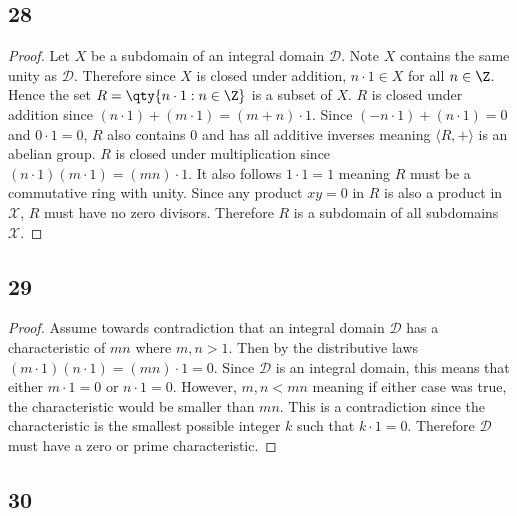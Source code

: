 \documentclass[12pt,titlepage]{extarticle}
\begin{document}
\subsection*{28}
\begin{proof}
    Let $X$ be a subdomain of an integral domain $\mathcal{D}$. Note $X$ contains the same unity as $\mathcal{D}$. Therefore since $X$ is closed under addition, $n \cdot 1 \in X$ for all $n \in \Z$. Hence the set $R = \qty{n \cdot 1 : n \in \Z}$ is a subset of $X$. $R$ is closed under addition since $(n \cdot 1) + (m \cdot 1) = (m + n) \cdot 1$. Since $(-n \cdot 1) + (n \cdot 1) = 0$ and $0 \cdot 1 = 0$, $R$ also contains $0$ and has all additive inverses meaning $\langle R, + \rangle$ is an abelian group. $R$ is closed under multiplication since $(n \cdot 1) (m \cdot 1) = (mn) \cdot 1$. It also follows $1 \cdot 1 = 1$ meaning $R$ must be a commutative ring with unity. Since any product $xy = 0$ in $R$ is also a product in $\mathcal{X}$, $R$ must have no zero divisors. Therefore $R$ is a subdomain of all subdomains $\mathcal{X}$.
\end{proof}

\subsection*{29}
\begin{proof}
    Assume towards contradiction that an integral domain $\mathcal{D}$ has a characteristic of $mn$ where $m,n > 1$. Then by the distributive laws $(m \cdot 1)(n \cdot 1) = (mn) \cdot 1 = 0$. Since $\mathcal{D}$ is an integral domain, this means that either $m \cdot 1 = 0$ or $n \cdot 1 = 0$. However, $m, n < mn$ meaning if either case was true, the characteristic would be smaller than $mn$. This is a contradiction since the characteristic is the smallest possible integer $k$ such that $k \cdot 1 = 0$. Therefore $\mathcal{D}$ must have a zero or prime characteristic.
\end{proof}

\subsection*{30}
\end{document}
